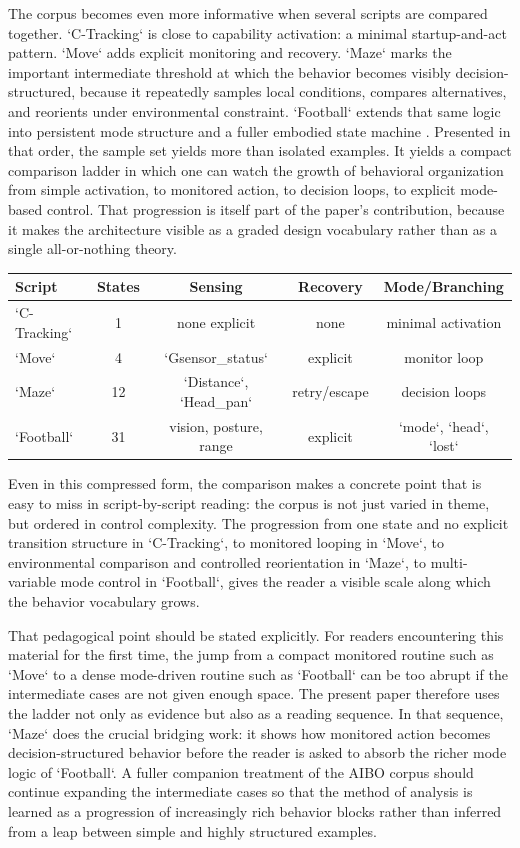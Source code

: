 \documentclass[11pt]{article}
\begin{document}
The corpus becomes even more informative when several scripts are compared together. `C-Tracking` is close to capability activation: a minimal startup-and-act pattern. `Move` adds explicit monitoring and recovery. `Maze` marks the important intermediate threshold at which the behavior becomes visibly decision-structured, because it repeatedly samples local conditions, compares alternatives, and reorients under environmental constraint. `Football` extends that same logic into persistent mode structure and a fuller embodied state machine \citep{tucker2026behavioral}. Presented in that order, the sample set yields more than isolated examples. It yields a compact comparison ladder in which one can watch the growth of behavioral organization from simple activation, to monitored action, to decision loops, to explicit mode-based control. That progression is itself part of the paper's contribution, because it makes the architecture visible as a graded design vocabulary rather than as a single all-or-nothing theory.

\begin{center}
\begin{tabular}{lcccc}
\hline
Script & States & Sensing & Recovery & Mode/Branching \\
\hline
`C-Tracking` & 1 & none explicit & none & minimal activation \\
`Move` & 4 & `Gsensor\_status` & explicit & monitor loop \\
`Maze` & 12 & `Distance`, `Head\_pan` & retry/escape & decision loops \\
`Football` & 31 & vision, posture, range & explicit & `mode`, `head`, `lost` \\
\hline
\end{tabular}
\end{center}

Even in this compressed form, the comparison makes a concrete point that is easy to miss in script-by-script reading: the corpus is not just varied in theme, but ordered in control complexity. The progression from one state and no explicit transition structure in `C-Tracking`, to monitored looping in `Move`, to environmental comparison and controlled reorientation in `Maze`, to multi-variable mode control in `Football`, gives the reader a visible scale along which the behavior vocabulary grows.

That pedagogical point should be stated explicitly. For readers encountering this material for the first time, the jump from a compact monitored routine such as `Move` to a dense mode-driven routine such as `Football` can be too abrupt if the intermediate cases are not given enough space. The present paper therefore uses the ladder not only as evidence but also as a reading sequence. In that sequence, `Maze` does the crucial bridging work: it shows how monitored action becomes decision-structured behavior before the reader is asked to absorb the richer mode logic of `Football`. A fuller companion treatment of the AIBO corpus should continue expanding the intermediate cases so that the method of analysis is learned as a progression of increasingly rich behavior blocks rather than inferred from a leap between simple and highly structured examples.
\end{document}
